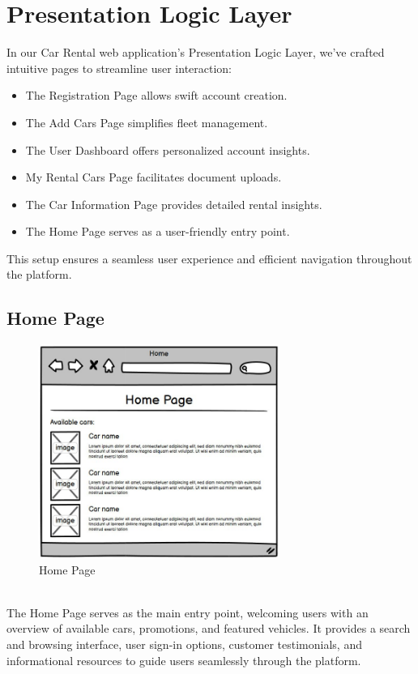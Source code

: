\section{Presentation Logic Layer}

In our Car Rental web application's Presentation Logic Layer, we've crafted intuitive pages to streamline user interaction:\\

\begin{itemize}
    \item The Registration Page allows swift account creation.
    \item The Add Cars Page simplifies fleet management.
    \item The User Dashboard offers personalized account insights.
    \item My Rental Cars Page facilitates document uploads.
    \item The Car Information Page provides detailed rental insights.
    \item The Home Page serves as a user-friendly entry point.\\
\end{itemize}

This setup ensures a seamless user experience and efficient navigation throughout the platform.

\subsection{Home Page}


\begin{figure}[h]
\centering
\includegraphics[width=0.7\textwidth, inner]{sections/HomePage.jpg}
\caption{Home Page}
\end{figure}\\
The Home Page serves as the main entry point, welcoming users with an overview of available cars, promotions, and featured vehicles. It provides a search and browsing interface, user sign-in options, customer testimonials, and informational resources to guide users seamlessly through the platform.\newpage
